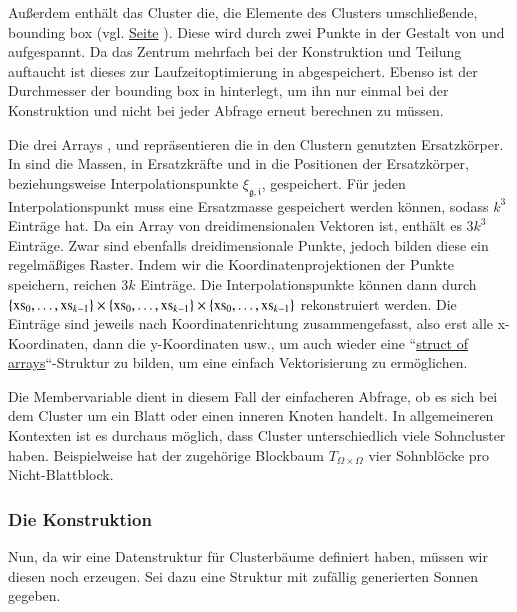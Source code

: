     Außerdem enthält das Cluster die, die Elemente des Clusters umschließende, bounding box (vgl. \hyperref[w:bbox]{Seite} \pageref{w:bbox}). Diese wird durch zwei Punkte in der Gestalt 
    von  und  aufgespannt. 
    Da das Zentrum mehrfach bei der Konstruktion und Teilung auftaucht ist dieses zur Laufzeitoptimierung in  abgespeichert.
    Ebenso ist der Durchmesser der bounding box in  hinterlegt, um ihn nur einmal bei der Konstruktion und nicht bei jeder Abfrage erneut berechnen zu müssen.
    
    Die drei Arrays ,  und  repräsentieren die in den Clustern genutzten Ersatzkörper. In  sind die  Massen, in  
    Ersatzkräfte und in  die Positionen der Ersatzkörper, beziehungsweise Interpolationspunkte $\xi_{\mathfrak{g}, \mathfrak{i}}$, gespeichert. Für jeden Interpolationspunkt muss
    eine Ersatzmasse gespeichert werden können, sodass  $k^3$ Einträge hat.
    Da  ein Array von dreidimensionalen Vektoren ist, enthält es $3 k^3$ Einträge. Zwar sind  ebenfalls dreidimensionale Punkte, jedoch bilden diese ein regelmäßiges Raster. Indem
    wir die Koordinatenprojektionen der Punkte speichern, reichen $3 k$ Einträge. Die Interpolationspunkte können dann durch 
    $\{\tcode{xs}_0, \dots ,\tcode{xs}_{k-1}\} \times \{\tcode{xs}_0, \dots ,\tcode{xs}_{k-1}\} \times \{\tcode{xs}_0, \dots ,\tcode{xs}_{k-1}\}$ rekonstruiert werden.
    Die Einträge sind jeweils nach Koordinatenrichtung zusammengefasst, also erst alle x-Koordinaten, dann die y-Koordinaten usw., um auch wieder eine ``\hyperref[w:aos]{struct of arrays}``-Struktur 
    zu bilden, um eine einfach Vektorisierung zu ermöglichen.
    
    Die Membervariable  dient in diesem Fall der einfacheren Abfrage, ob es sich bei dem Cluster um ein Blatt oder einen inneren Knoten handelt. In allgemeineren Kontexten 
    ist es durchaus möglich, dass Cluster unterschiedlich viele Sohncluster haben. Beispielweise hat der zugehörige Blockbaum $T_{\Omega \times \Omega}$ vier Sohnblöcke pro Nicht-Blattblock. 
    
    \subsubsection{Die Konstruktion}
    
    Nun, da wir eine Datenstruktur für Clusterbäume definiert haben, müssen wir diesen noch erzeugen. Sei dazu eine  Struktur mit zufällig generierten Sonnen gegeben.
    
